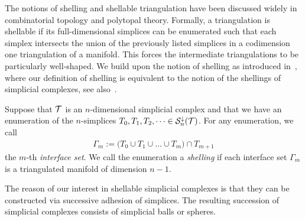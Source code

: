 \documentclass[10pt,a4paper]{article}
\begin{document}
The notions of shelling and shellable triangulation have been discussed widely in combinatorial topology and polytopal theory. 
Formally, a triangulation is shellable if its full-dimensional simplices can be enumerated such that each simplex intersects the union of the previously listed simplices in a codimension one triangulation of a manifold. 
This forces the intermediate triangulations to be particularly well-shaped. 
We build upon the notion of shelling as introduced in~\cite[Definition 8.1]{ziegler1995lectures},
where our definition of shelling is equivalent to the notion of the shellings of simplicial complexes, see also~\cite[Remark~8.3]{ziegler1995lectures}. 




Suppose that ${\mathcal T}$ is an $n$-dimensional simplicial complex and that we have an enumeration of the $n$-simplices $T_{0}, T_{1}, T_{2}, \dots \in {\mathcal S}^{\downarrow}_{n}({\mathcal T})$.
For any enumeration, we call 
\begin{align*}
    \Gamma_m 
    := 
    \big( 
        T_{0} \cup T_{1} \cup \dots \cup T_{m} 
    \big) 
    \cap 
    T_{m+1}
\end{align*}
the $m$-th \emph{interface set}. 
We call the enumeration a \emph{shelling} if each interface set $\Gamma_m$ is a triangulated manifold of dimension $n-1$. 

The reason of our interest in shellable simplicial complexes is that they can be constructed via successive adhesion of simplices.
The resulting succession of simplicial complexes consists of simplicial balls or spheres. 
\end{document}
